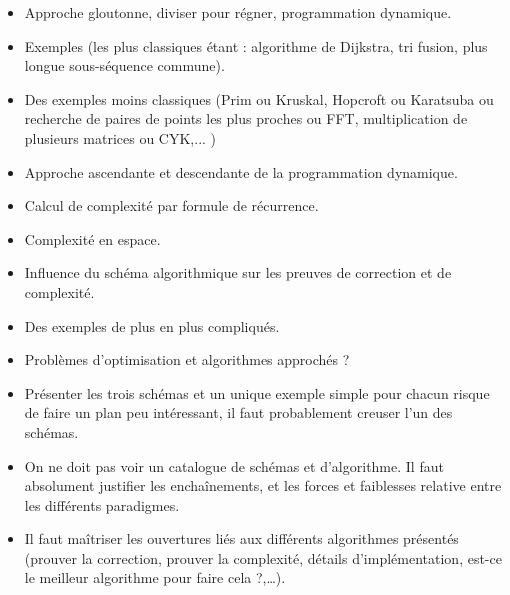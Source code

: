 \documentclass{agregfiche}
\begin{document}
\secindispensables
\begin{itemize}
    \item Approche gloutonne, diviser pour régner, programmation dynamique.
    \item Exemples (les plus classiques étant : algorithme de Dijkstra, tri fusion, plus longue sous-séquence commune).
\end{itemize}

\secasavoir

\begin{itemize}
    \item Des exemples moins classiques (Prim ou Kruskal, Hopcroft ou Karatsuba ou recherche de paires de points les plus proches ou FFT, multiplication de plusieurs matrices ou CYK,...  )
    \item Approche ascendante et descendante de la programmation dynamique.
    \item Calcul de complexité par formule de récurrence.
    \item Complexité en espace.
    \item Influence du schéma algorithmique sur les preuves de correction et de complexité.
\end{itemize}

\secidees

\begin{itemize}
    \item Des exemples de plus en plus compliqués.
    \item Problèmes d'optimisation et algorithmes approchés ?
\end{itemize}

\secpieges

\begin{itemize}
    \item Présenter les trois schémas et un unique exemple simple pour chacun risque de faire un plan peu intéressant, il faut probablement creuser l'un des schémas.
    \item On ne doit pas voir un catalogue de schémas et d'algorithme. Il faut absolument justifier les enchaînements, et les forces et faiblesses relative entre les différents paradigmes.
    \item Il faut maîtriser les ouvertures liés aux différents algorithmes présentés (prouver la correction, prouver la complexité, détails d'implémentation, est-ce le meilleur algorithme pour faire cela ?,\ldots).

\end{itemize}
\end{document}
